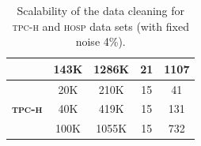 \begin{table}[t]
\begin{tabular}{@{}ccccc@{}}
\multicolumn{1}{l}{} & 143K                                                             & 1286K                                                        & 21                                                                                                                                        & 1107                                                          \\ \midrule
\multicolumn{1}{l}{} & 20K                                                              & 210K                                                        & 15                                                                                                                                        & 41                                                            \\
{\bf \textsc{tpc-h}}           & 40K                                                              & 419K                                                        & 15                                                                                                                                        & 131                                                           \\
\multicolumn{1}{l}{} & 100K                                                             & 1055K                                                        & 15                                                                                                                                        & 732                                                           \\ \bottomrule
\end{tabular}
\caption{\label{tab:runtime} Scalability of the data cleaning for \textsc{tpc-h} and \textsc{hosp} data sets (with fixed noise 4\%). }
\end{table}


